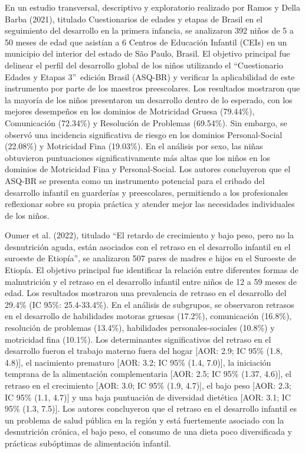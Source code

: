 \documentclass[11pt,letterpaper]{report}
\newcommand{\asq}{“Cuestionario Edades y Etapas 3”}
\begin{document}
En un estudio transversal, descriptivo y exploratorio realizado por Ramos y
Della Barba (2021), titulado Cuestionarios de edades y etapas de Brasil en el
seguimiento del desarrollo en la primera infancia, se analizaron 392 niños de 
5 a 50 meses de edad que asistían a 6 Centros de Educación Infantil (CEIs) en
un municipio del interior del estado de São Paulo, Brasil. El objetivo
principal fue delinear el perfil del desarrollo global de los niños utilizando 
el \asq\ edición Brasil (ASQ-BR) y verificar la aplicabilidad
de este instrumento por parte de los maestros preescolares. Los resultados
mostraron que la mayoría de los niños presentaron un desarrollo dentro de lo 
esperado, con los mejores desempeños en los dominios de Motricidad Gruesa
(79.44\%), Comunicación (72.34\%) y Resolución de Problemas (69.54\%). Sin
embargo, se observó una incidencia significativa de riesgo en los dominios
Personal-Social (22.08\%) y Motricidad Fina (19.03\%). En el análisis por sexo,
las niñas obtuvieron puntuaciones significativamente más altas que los niños en
los dominios de Motricidad Fina y Personal-Social. Los autores concluyeron que
el ASQ-BR se presenta como un instrumento potencial para el cribado del
desarrollo infantil en guarderías y preescolares, permitiendo a los
profesionales reflexionar sobre su propia práctica y atender mejor las
necesidades individuales de los niños. \cite{RAMOS2021}

Oumer et al. (2022), titulado “El retardo de crecimiento y bajo peso, pero no
la desnutrición aguda, están asociados con el retraso en el desarrollo
infantil en el suroeste de Etiopía”, se analizaron 507 pares de madres e hijos
en el Suroeste de Etiopía. El objetivo principal fue identificar la relación
entre diferentes formas de malnutrición y el retraso en el desarrollo infantil
entre niños de 12 a 59 meses de edad. Los resultados mostraron una prevalencia
de retraso en el desarrollo del 29.4\% (IC 95\%: 25.4-33.4\%). En el análisis
de subgrupos, se observaron retrasos en el desarrollo de habilidades motoras
gruesas (17.2\%), comunicación (16.8\%), resolución de problemas (13.4\%),
habilidades personales-sociales (10.8\%) y motricidad fina (10.1\%).
Los determinantes significativos del retraso en el desarrollo fueron el trabajo
materno fuera del hogar [AOR: 2.9; IC 95\% (1.8, 4.8)], el nacimiento prematuro
[AOR: 3.2; IC 95\% (1.4, 7.0)], la iniciación temprana de la alimentación
complementaria [AOR: 2.5; IC 95\% (1.37, 4.6)], el retraso en el crecimiento
[AOR: 3.0; IC 95\% (1.9, 4.7)], el bajo peso [AOR: 2.3; IC 95\% (1.1, 4.7)] y
una baja puntuación de diversidad dietética [AOR: 3.1; IC 95\% (1.3, 7.5)].
Los autores concluyeron que el retraso en el desarrollo infantil es un problema
de salud pública en la región y está fuertemente asociado con la desnutrición
crónica, el bajo peso, el consumo de una dieta poco diversificada y prácticas
subóptimas de alimentación infantil.
\cite{Oumer2022}
\end{document}
